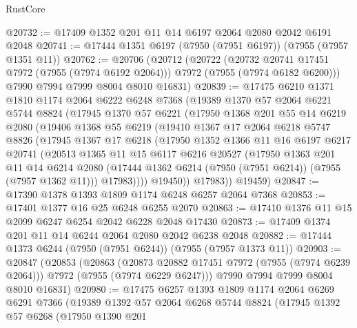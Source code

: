 \begin{lexlean}{RustCore}
\begin{coremodule}
@20732 := @17409 @1352 @201 @11 @14 @6197 @2064 @2080 @2042 @6191 @2048
@20741 := @17444 @1351 @6197 (@7950 (@7951 @6197)) (@7955 (@7957 @1351 @11))
@20762 := @20706
    (@20712
      (@20722
        (@20732 @20741 @17451 @7972 (@7955 (@7974 @6192 @2064)))
        @7972
        (@7955 (@7974 @6182 @6200)))
      @7990
      @7994
      @7999
      @8004
      @8010
      @16831)
@20839 := @17475
    @6210
    @1371
    @1810
    @1174
    @2064
    @6222
    @6248
    @7368
    (@19389
      @1370
      @57
      @2064
      @6221
      @5744
      @8824
      (@17945
        @1370
        @57
        @6221
        (@17950
          @1368
          @201
          @55
          @14
          @6219
          @2080
          (@19406
            @1368
            @55
            @6219
            (@19410
              @1367
              @17
              @2064
              @6218
              @5747
              @8826
              (@17945
                @1367
                @17
                @6218
                (@17950
                  @1352
                  @1366
                  @11
                  @16
                  @6197
                  @6217
                  @20741
                  (@20513
                    @1365
                    @11
                    @15
                    @6117
                    @6216
                    @20527
                    (@17950
                      @1363
                      @201
                      @11
                      @14
                      @6214
                      @2080
                      (@17444 @1362 @6214 (@7950 (@7951 @6214)) (@7955 (@7957 @1362 @11)))
                      @17983))))
              @19450))
          @17983))
      @19459)
@20847 := @17390 @1378 @1393 @1809 @1174 @6248 @6257 @2064 @7368
@20853 := @17401 @1377 @16 @25 @6248 @6255 @2070
@20863 := @17410 @1376 @11 @15 @2099 @6247 @6254 @2042 @6228 @2048 @17430
@20873 := @17409 @1374 @201 @11 @14 @6244 @2064 @2080 @2042 @6238 @2048
@20882 := @17444 @1373 @6244 (@7950 (@7951 @6244)) (@7955 (@7957 @1373 @11))
@20903 := @20847
    (@20853
      (@20863
        (@20873 @20882 @17451 @7972 (@7955 (@7974 @6239 @2064)))
        @7972
        (@7955 (@7974 @6229 @6247)))
      @7990
      @7994
      @7999
      @8004
      @8010
      @16831)
@20980 := @17475
    @6257
    @1393
    @1809
    @1174
    @2064
    @6269
    @6291
    @7366
    (@19389
      @1392
      @57
      @2064
      @6268
      @5744
      @8824
      (@17945
        @1392
        @57
        @6268
        (@17950
          @1390
          @201

\end{coremodule}
\end{lexlean}
